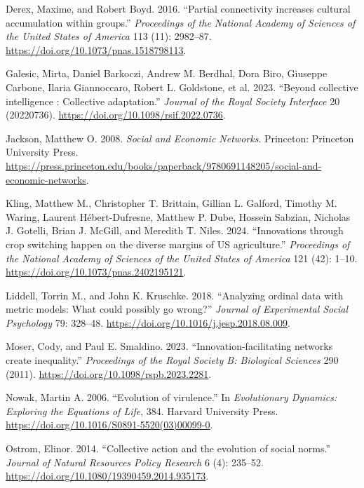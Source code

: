 \documentclass[letterpaper]{article}
\newlength{\cslhangindent}
\newenvironment{CSLReferences}[2] %
 {\begin{list}{}{%
  \setlength{\itemindent}{0pt}
  \setlength{\leftmargin}{0pt}
  \setlength{\parsep}{0pt}
  \ifodd #1
   \setlength{\leftmargin}{\cslhangindent}
   \setlength{\itemindent}{-1\cslhangindent}
  \fi
  \setlength{\itemsep}{#2\baselineskip}}}
 {\end{list}}
\begin{document}
\begin{CSLReferences}{1}{0}
Derex, Maxime, and Robert Boyd. 2016. {``{Partial connectivity increases
cultural accumulation within groups}.''} \emph{Proceedings of the
National Academy of Sciences of the United States of America} 113 (11):
2982--87. \url{https://doi.org/10.1073/pnas.1518798113}.

Galesic, Mirta, Daniel Barkoczi, Andrew M. Berdhal, Dora Biro, Giuseppe
Carbone, Ilaria Giannoccaro, Robert L. Goldstone, et al. 2023.
{``{Beyond collective intelligence : Collective adaptation}.''}
\emph{Journal of the Royal Society Interface} 20 (20220736).
\url{https://doi.org/10.1098/rsif.2022.0736}.

Jackson, Matthew O. 2008. \emph{{Social and Economic Networks}}.
Princeton: Princeton University Press.
\url{https://press.princeton.edu/books/paperback/9780691148205/social-and-economic-networks}.

Kling, Matthew M., Christopher T. Brittain, Gillian L. Galford, Timothy
M. Waring, Laurent Hébert-Dufresne, Matthew P. Dube, Hossein Sabzian,
Nicholas J. Gotelli, Brian J. McGill, and Meredith T. Niles. 2024.
{``{Innovations through crop switching happen on the diverse margins of
US agriculture}.''} \emph{Proceedings of the National Academy of
Sciences of the United States of America} 121 (42): 1--10.
\url{https://doi.org/10.1073/pnas.2402195121}.

Liddell, Torrin M., and John K. Kruschke. 2018. {``{Analyzing ordinal
data with metric models: What could possibly go wrong?}''} \emph{Journal
of Experimental Social Psychology} 79: 328--48.
\url{https://doi.org/10.1016/j.jesp.2018.08.009}.

Moser, Cody, and Paul E. Smaldino. 2023. {``{Innovation-facilitating
networks create inequality}.''} \emph{Proceedings of the Royal Society
B: Biological Sciences} 290 (2011).
\url{https://doi.org/10.1098/rspb.2023.2281}.

Nowak, Martin A. 2006. {``{Evolution of virulence}.''} In
\emph{Evolutionary Dynamics: Exploring the Equations of Life}, 384.
Harvard University Press.
\url{https://doi.org/10.1016/S0891-5520(03)00099-0}.

Ostrom, Elinor. 2014. {``{Collective action and the evolution of social
norms}.''} \emph{Journal of Natural Resources Policy Research} 6 (4):
235--52. \url{https://doi.org/10.1080/19390459.2014.935173}.


\end{CSLReferences}
\end{document}
